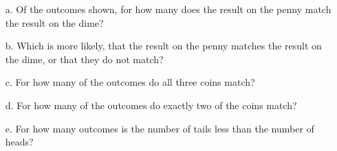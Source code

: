 \begin{questionNOGRADE}{\thequestion}
\begin{center}
        \end{center}

        \begin{enumerate}
                \item[a.]   Of the outcomes shown, for how many does
                            the result on the penny match the result on the dime?

                \item[b.]   Which is more likely, that the result on the penny
                            matches the result on the dime, or that they do not match?

                \item[c.]   For how many of the outcomes do all three coins match?

                \item[d.]   For how many of the outcomes do exactly two of the coins match?

                \item[e.]   For how many outcomes is the number of tails less than the number of heads?
        \end{enumerate}
        
    \end{questionNOGRADE}

    


